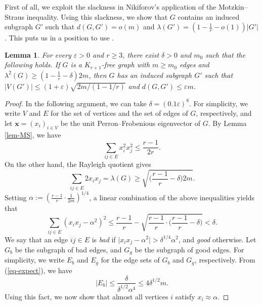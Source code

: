\documentclass[11pt,a4paper]{article}
\newtheorem{lemma}[theorem]{Lemma}
\theoremstyle{definition}
\theoremstyle{remark}
\newcommand*{\abs}[1]{\lvert#1\rvert}
\begin{document}
First of all, we exploit the slackness in Nikiforov's application of the Motzkin--Straus inequality. Using this slackness, we show that $G$ contains an induced subgraph $G'$ such that $d(G,G')=o(m)$ 
and $\lambda (G')= (1-\frac{1}{r}- o(1))|G'|$. This puts us in a position to use .

\begin{lemma}
\label{lem:nikiforov-stability-clique}  
For every $\varepsilon > 0$ and $r \geq 3$, 
there exist $\delta>0$ and  $m_0$ such that the following holds. If $G$ is a $K_{r + 1}$-free graph with $m\ge m_0$ edges and $\lambda^2 (G)\ge (1- \frac{1}{r} - \delta) 2m$, then $G$ has an induced subgraph $G'$ such that $\abs{V(G')} \leq (1 + \varepsilon) \sqrt{2m / (1 - 1/r)}$ and $d(G, G') \leq \varepsilon m$.
\end{lemma}
\begin{proof}
    In the following argument, we can take $\delta = (0.1\varepsilon)^8$.  
    For simplicity, we write $V$ and $E$ for the set of vertices and the set of edges of $G$, respectively, and 
    let $\bm{x}=(x_i)_{i\in V}$ be the unit Perron--Frobenious eigenvector of $G$. 
    By Lemma \ref{lem-MS}, we have
    \begin{equation*}\label{eq:MS}
        \sum_{ij \in E} x_i^2x_j^2 \leq \frac{r - 1}{2r}.
    \end{equation*}
    On the other hand, the Rayleigh quotient gives 
    $$\sum_{ij \in E} 2x_i x_j = \lambda(G) \geq \sqrt{\Big(\frac{r-1}{r} - \delta \Big) 2m}.$$
    Setting $\alpha :=(\frac{r-1}{r}\cdot \frac{1}{2m} )^{1/4}$, a linear combination of the above inequalities yields that
    \begin{equation} \label{eq-expect}
    \sum_{ij \in E} \left(x_i x_j - \alpha^2\right)^2 \leq \frac{r - 1}{r} - \sqrt{\frac{r-1}{r} \cdot \Big(\frac{r - 1}{r}-\delta\Big)} < \delta.
    \end{equation}
    We say that an edge $ij \in E$ is \emph{bad} if $\abs{x_i x_j - \alpha^2} > \delta^{1/4} \alpha^2$, and \emph{good} otherwise. Let $G_b$ be the subgraph of bad edges, and $G_g$ be the subgraph of good edges. 
    For simplicity, we write $E_b$ and $E_g$ for the edge sets of $G_b$ and $G_g$, respectively. 
    From (\ref{eq-expect}), we have 
    \begin{equation} \label{upper-Eb}
         |E_b| \le \frac{\delta}{\delta^{1/2}\alpha^4} \leq 4\delta^{1/2} m.
    \end{equation}
    Using this fact, we now show that almost all vertices $i$ satisfy $x_i \approx \alpha$.


\end{proof}
\end{document}
